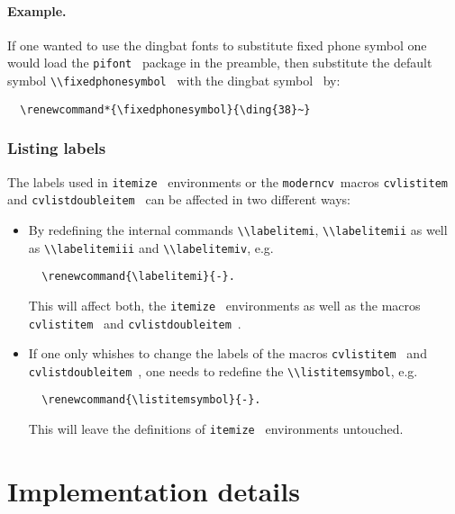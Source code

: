 \documentclass[a4paper,11pt]{article}
\newcommand{\code}[1]{\lstinline!#1!}
\newcommand{\Code}[1]{\lstinline!#1!~} %
\newcommand{\Moderncv}{\Code{moderncv}}
\begin{document}
\paragraph{Example.}
If one wanted to use the dingbat fonts to substitute fixed phone symbol one would load the \Code{pifont} package in the preamble, then substitute the default symbol \Code{\\fixedphonesymbol} with the dingbat symbol \ by:
\begin{lstlisting}
  \renewcommand*{\fixedphonesymbol}{\ding{38}~}
\end{lstlisting} 

\subsubsection{Listing labels}
The labels used in \Code{itemize} environments or the \Moderncv macros \code{cvlistitem} and \Code{cvlistdoubleitem} can be affected in two different ways:

\begin{itemize}
 \item By redefining the internal commands \code{\\labelitemi}, \code{\\labelitemii} as well as
  \code{\\labelitemiii} and \code{\\labelitemiv}, e.g. 
  \begin{lstlisting}
  \renewcommand{\labelitemi}{-}.
  \end{lstlisting}
  This will affect both, the \Code{itemize} environments as well as the macros \Code{cvlistitem} and \Code{cvlistdoubleitem}.
  \item If one only whishes to change the labels of the macros \Code{cvlistitem} and \Code{cvlistdoubleitem}, one needs to redefine the \code{\\listitemsymbol}, e.g.
\begin{lstlisting}
  \renewcommand{\listitemsymbol}{-}.
\end{lstlisting}
This will leave the definitions of \Code{itemize} environments untouched.
\end{itemize}


\section{Implementation details}
\label{section:implementationDetails}
\end{document}
